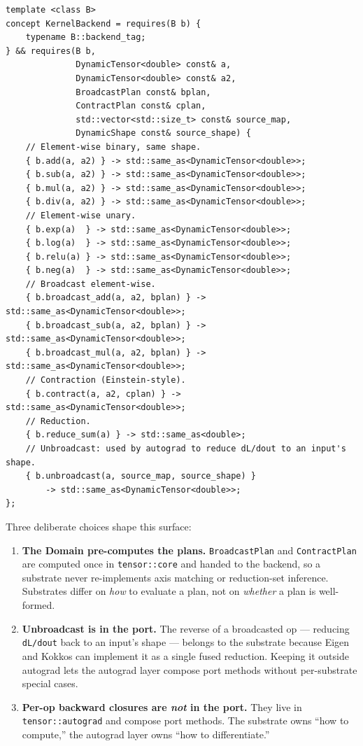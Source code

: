 \documentclass[10pt,twocolumn]{article}
\newcommand{\code}[1]{\texttt{#1}}
\begin{document}
\begin{lstlisting}[language=cppx]
template <class B>
concept KernelBackend = requires(B b) {
    typename B::backend_tag;
} && requires(B b,
              DynamicTensor<double> const& a,
              DynamicTensor<double> const& a2,
              BroadcastPlan const& bplan,
              ContractPlan const& cplan,
              std::vector<std::size_t> const& source_map,
              DynamicShape const& source_shape) {
    // Element-wise binary, same shape.
    { b.add(a, a2) } -> std::same_as<DynamicTensor<double>>;
    { b.sub(a, a2) } -> std::same_as<DynamicTensor<double>>;
    { b.mul(a, a2) } -> std::same_as<DynamicTensor<double>>;
    { b.div(a, a2) } -> std::same_as<DynamicTensor<double>>;
    // Element-wise unary.
    { b.exp(a)  } -> std::same_as<DynamicTensor<double>>;
    { b.log(a)  } -> std::same_as<DynamicTensor<double>>;
    { b.relu(a) } -> std::same_as<DynamicTensor<double>>;
    { b.neg(a)  } -> std::same_as<DynamicTensor<double>>;
    // Broadcast element-wise.
    { b.broadcast_add(a, a2, bplan) } -> std::same_as<DynamicTensor<double>>;
    { b.broadcast_sub(a, a2, bplan) } -> std::same_as<DynamicTensor<double>>;
    { b.broadcast_mul(a, a2, bplan) } -> std::same_as<DynamicTensor<double>>;
    // Contraction (Einstein-style).
    { b.contract(a, a2, cplan) } -> std::same_as<DynamicTensor<double>>;
    // Reduction.
    { b.reduce_sum(a) } -> std::same_as<double>;
    // Unbroadcast: used by autograd to reduce dL/dout to an input's shape.
    { b.unbroadcast(a, source_map, source_shape) }
        -> std::same_as<DynamicTensor<double>>;
};
\end{lstlisting}

Three deliberate choices shape this surface:

\begin{enumerate}
  \item \textbf{The Domain pre-computes the plans.} \code{BroadcastPlan}
        and \code{ContractPlan} are computed once in
        \code{tensor::core} and handed to the backend, so a substrate
        never re-implements axis matching or reduction-set inference.
        Substrates differ on \emph{how} to evaluate a plan, not on
        \emph{whether} a plan is well-formed.
  \item \textbf{Unbroadcast is in the port.} The reverse of a
        broadcasted op --- reducing \code{dL/dout} back to an input's
        shape --- belongs to the substrate because Eigen and Kokkos
        can implement it as a single fused reduction. Keeping it
        outside autograd lets the autograd layer compose port methods
        without per-substrate special cases.
  \item \textbf{Per-op backward closures are \emph{not} in the port.}
        They live in \code{tensor::autograd} and compose port
        methods. The substrate owns ``how to compute,'' the autograd
        layer owns ``how to differentiate.''
\end{enumerate}
\end{document}

